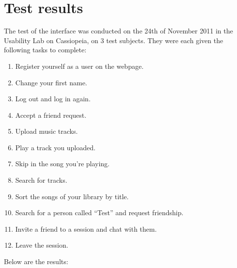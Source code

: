 \section{Test results}
The test of the interface was conducted on the 24th of November 2011 in the Usability Lab on Cassiopeia, on 3 test subjects.
They were each given the following tasks to complete:
\begin{enumerate}
	\item Register yourself as a user on the webpage.
	\item Change your first name.
	\item Log out and log in again.
	\item Accept a friend request.
	\item Upload music tracks.
	\item Play a track you uploaded.
	\item Skip in the song you're playing.
	\item Search for tracks.
	\item Sort the songs of your library by title.
	\item Search for a person called ``Test'' and request friendship.
	\item Invite a friend to a session and chat with them. 
	\item Leave the session.
\end{enumerate}

Below are the results:


